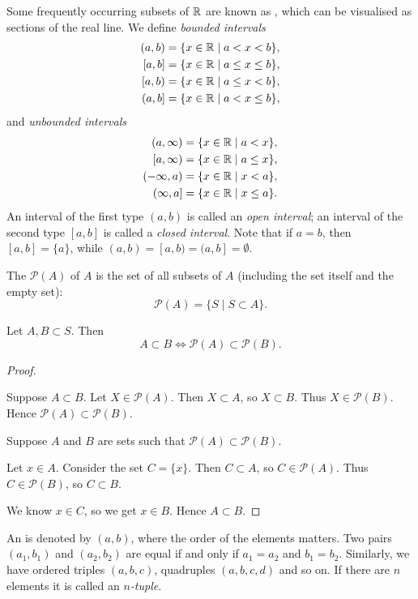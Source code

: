 Some frequently occurring subsets of $\mathbb R$ are known as , which can be visualised as sections of the real line. We define \emph{bounded intervals}
\begin{align*}
(a,b)&=\{x\in\RR\mid a<x<b\},\\
[a,b]&=\{x\in\RR\mid a\le x\le b\},\\
[a,b)&=\{x\in\RR\mid a\le x<b\},\\
(a,b]&=\{x\in\RR\mid a<x\le b\},
\end{align*}
and \emph{unbounded intervals}
\begin{align*}
(a,\infty)&=\{x\in\RR\mid a<x\},\\
[a,\infty)&=\{x\in\RR\mid a\le x\},\\
(-\infty,a)&=\{x\in\RR\mid x<a\},\\
(\infty,a]&=\{x\in\RR\mid x\le a\}.
\end{align*}
An interval of the first type $(a,b)$ is called an \emph{open interval}; an interval of the second type $[a,b]$ is called a \emph{closed interval}. Note that if $a=b$, then $[a,b]=\{a\}$, while $(a,b)=[a,b)=(a,b]=\emptyset$.

The  $\mathcal{P}(A)$ of $A$ is the set of all subsets of $A$ (including the set itself and the empty set):
\[\mathcal{P}(A)=\{S\mid S\subset A\}.\]

\begin{lemma}
Let $A,B\subset S$. Then
\[A\subset B\iff\mathcal{P}(A)\subset\mathcal{P}(B).\]
\end{lemma}

\begin{proof} \

\forward Suppose $A\subset B$. Let $X\in\mathcal{P}(A)$. Then $X\subset A$, so $X\subset B$. Thus $X\in\mathcal{P}(B)$. Hence $\mathcal{P}(A)\subset\mathcal{P}(B)$.

\backward Suppose $A$ and $B$ are sets such that $\mathcal{P}(A)\subset\mathcal{P}(B)$.

Let $x\in A$. Consider the set $C=\{x\}$. Then $C\subset A$, so $C\in\mathcal{P}(A)$. Thus $C\in\mathcal{P}(B)$, so $C\subset B$. 

We know $x\in C$, so we get $x\in B$. Hence $A\subset B$.
\end{proof}

An  is denoted by $(a,b)$, where the order of the elements matters. Two pairs $(a_1,b_1)$ and $(a_2,b_2)$ are equal if and only if $a_1=a_2$ and $b_1=b_2$.  Similarly, we have ordered triples $(a,b,c)$, quadruples $(a,b,c,d)$ and so on. If there are $n$ elements it is called an \emph{$n$-tuple}.

